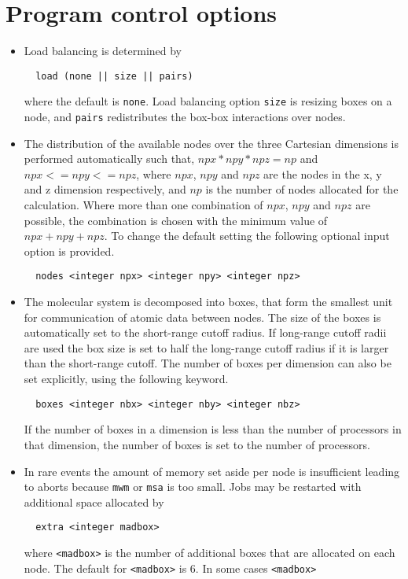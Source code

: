 \section{Program control options}
\begin{itemize}
\item
Load balancing is determined by
\begin{verbatim}
  load (none || size || pairs)
\end{verbatim}
where the default is {\tt none}. Load balancing option {\tt size}
is resizing boxes on a node, and {\tt pairs} redistributes the
box-box interactions over nodes.
\item
The distribution of the available nodes over the three Cartesian
dimensions is performed automatically such that, $npx*npy*npz=np$
and $npx<=npy<=npz$, where $npx$, $npy$ and $npz$ are the nodes in the
x, y and z dimension respectively, and $np$ is the number of nodes
allocated for the calculation. Where more than one combination
of $npx$, $npy$ and $npz$ are possible, the combination is chosen with
the minimum value of $npx+npy+npz$. To change the default setting
the following optional input option is provided.
\begin{verbatim}
  nodes <integer npx> <integer npy> <integer npz>
\end{verbatim}
\item
The molecular system is decomposed into boxes, that form the smallest
unit for communication of atomic data between nodes. The size of the
boxes is automatically set to the short-range cutoff radius. If
long-range cutoff radii  are used the box size is set to half the
long-range cutoff radius if it is larger than the short-range cutoff.
The number of boxes per dimension can also be set explicitly, using
the following keyword.
\begin{verbatim}
  boxes <integer nbx> <integer nby> <integer nbz>
\end{verbatim}
If the number of boxes in a dimension is less than the number of
processors in that dimension, the number of boxes is set to the number
of processors.
\item
In rare events the amount of memory set aside per node is insufficient
leading to aborts because {\tt mwm} or {\tt msa} is too small. Jobs
may be restarted with additional space allocated by
\begin{verbatim}
  extra <integer madbox>
\end{verbatim}
where \verb+<madbox>+ is the number of additional boxes that are allocated
on each node. The default for \verb+<madbox>+ is 6. In some cases \verb+<madbox>+

\end{itemize}
